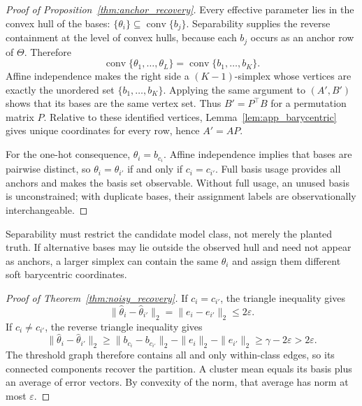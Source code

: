 \begin{proof}[Proof of Proposition~\ref{thm:anchor_recovery}]
Every effective parameter lies in the convex hull of the bases:
\(
\{\theta_i\}\subseteq\operatorname{conv}\{b_j\}
\).
Separability supplies the reverse containment at the level of convex hulls,
because each $b_j$ occurs as an anchor row of $\Theta$.  Therefore
\begin{equation}
 \operatorname{conv}\{\theta_1,\ldots,\theta_L\}
 =\operatorname{conv}\{b_1,\ldots,b_K\}.
 \label{eq:app_hull}
\end{equation}
Affine independence makes the right side a $(K-1)$-simplex whose vertices are
exactly the unordered set $\{b_1,\ldots,b_K\}$.  Applying the same argument to
$(A',B')$ shows that its bases are the same vertex set.  Thus
$B'=P^\top B$ for a permutation matrix $P$.  Relative to these identified
vertices, Lemma~\ref{lem:app_barycentric} gives unique coordinates for every
row, hence $A'=AP$.

For the one-hot consequence, $\theta_i=b_{c_i}$.  Affine independence implies
that bases are pairwise distinct, so
$\theta_i=\theta_{i'}$ if and only if $c_i=c_{i'}$.  Full basis usage provides
all anchors and makes the basis set observable.  Without full usage, an unused
basis is unconstrained; with duplicate bases, their assignment labels are
observationally interchangeable.
\end{proof}

Separability must restrict the candidate model class, not merely the planted
truth.  If alternative bases may lie outside the observed hull and need not
appear as anchors, a larger simplex can contain the same $\theta_i$ and assign
them different soft barycentric coordinates.

\begin{proof}[Proof of Theorem~\ref{thm:noisy_recovery}]
If $c_i=c_{i'}$, the triangle inequality gives
\begin{equation}
 \|\widehat\theta_i-\widehat\theta_{i'}\|_2
 =\|e_i-e_{i'}\|_2\le2\varepsilon.
\end{equation}
If $c_i\ne c_{i'}$, the reverse triangle inequality gives
\begin{equation}
 \|\widehat\theta_i-\widehat\theta_{i'}\|_2
 \ge\|b_{c_i}-b_{c_{i'}}\|_2-\|e_i\|_2-\|e_{i'}\|_2
 \ge\gamma-2\varepsilon>2\varepsilon.
\end{equation}
The threshold graph therefore contains all and only within-class edges, so its
connected components recover the partition.  A cluster mean equals its basis
plus an average of error vectors.  By convexity of the norm, that average has
norm at most $\varepsilon$.
\end{proof}

